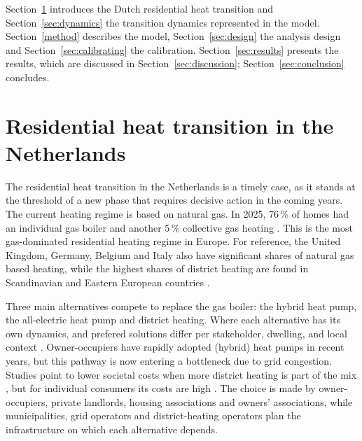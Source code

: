 \documentclass[preprint,12pt,authoryear]{elsarticle}
\begin{document}
Section~\ref{sec:context} introduces the Dutch residential heat transition
and Section~\ref{sec:dynamics} the transition dynamics represented in the
model. Section~\ref{method} describes the model, Section~\ref{sec:design} the
analysis design and Section~\ref{sec:calibrating} the calibration.
Section~\ref{sec:results} presents the results, which are discussed in
Section~\ref{sec:discussion}; Section~\ref{sec:conclusion} concludes.

\section{Residential heat transition in the Netherlands}
\label{sec:context}

The residential heat transition in the Netherlands is a timely case, as it
stands at the threshold of a new phase that requires decisive action in the
coming years. The current heating regime is based on natural gas. In 2025,
76\,\% of homes had an individual gas boiler and another 5\,\% collective gas
heating \citep{statistiekHoofdverwarmingsinstallatiesWoningen20252026}. This
is the most gas-dominated residential heating regime in Europe. For
reference, the United Kingdom, Germany, Belgium and Italy also have
significant shares of natural gas based heating, while the highest shares of
district heating are found in Scandinavian and Eastern European countries
\citep{bertelsenEU28ResidentialHeat2020}.

Three main alternatives compete to replace the gas boiler: the hybrid heat
pump, the all-electric heat pump and district heating. Where each alternative
has its own dynamics, and prefered solutions differ per stakeholder,
dwelling, and local context
\citep{loomansExploringTradeoffsDecisionsupport2024}. Owner-occupiers have
rapidly adopted (hybrid) heat pumps in recent years, but this pathway is now
entering a bottleneck due to grid congestion. Studies point to lower societal
costs when more district heating is part of the mix
\citep{ActualisatieStartanalyseAardgasvrije,
pblStartanalyseAardgasvrijeBuurten2020}, but for individual consumers its
costs are high \citep{saliteAssessingAdoptionSustainable2024}. The choice is
made by owner-occupiers, private landlords, housing associations and owners'
associations, while municipalities, grid operators and district-heating
operators plan the infrastructure on which each alternative depends.
\end{document}

